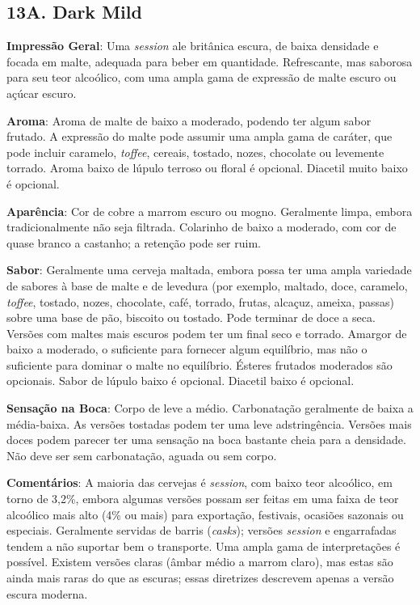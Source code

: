 \subsection*{13A. Dark Mild}
\textbf{Impressão Geral}: Uma \textit{session} ale britânica escura, de baixa densidade e focada em malte, adequada para beber em quantidade. Refrescante, mas saborosa para seu teor alcoólico, com uma ampla gama de expressão de malte escuro ou açúcar escuro.

\textbf{Aroma}: Aroma de malte de baixo a moderado, podendo ter algum sabor frutado. A expressão do malte pode assumir uma ampla gama de caráter, que pode incluir caramelo, \textit{toffee}, cereais, tostado, nozes, chocolate ou levemente torrado. Aroma baixo de lúpulo terroso ou floral é opcional. Diacetil muito baixo é opcional.

\textbf{Aparência}: Cor de cobre a marrom escuro ou mogno. Geralmente limpa, embora tradicionalmente não seja filtrada. Colarinho de baixo a moderado, com cor de quase branco a castanho; a retenção pode ser ruim.

\textbf{Sabor}: Geralmente uma cerveja maltada, embora possa ter uma ampla variedade de sabores à base de malte e de levedura (por exemplo, maltado, doce, caramelo, \textit{toffee}, tostado, nozes, chocolate, café, torrado, frutas, alcaçuz, ameixa, passas) sobre uma base de pão, biscoito ou tostado. Pode terminar de doce a seca. Versões com maltes mais escuros podem ter um final seco e torrado. Amargor de baixo a moderado, o suficiente para fornecer algum equilíbrio, mas não o suficiente para dominar o malte no equilíbrio. Ésteres frutados moderados são opcionais. Sabor de lúpulo baixo é opcional. Diacetil baixo é opcional.

\textbf{Sensação na Boca}: Corpo de leve a médio. Carbonatação geralmente de baixa a média-baixa. As versões tostadas podem ter uma leve adstringência. Versões mais doces podem parecer ter uma sensação na boca bastante cheia para a densidade. Não deve ser sem carbonatação, aguada ou sem corpo.

\textbf{Comentários}: A maioria das cervejas é \textit{session}, com baixo teor alcoólico, em torno de 3,2\%, embora algumas versões possam ser feitas em uma faixa de teor alcoólico mais alto (4\% ou mais) para exportação, festivais, ocasiões sazonais ou especiais. Geralmente servidas de barris (\textit{casks}); versões \textit{session} e engarrafadas tendem a não suportar bem o transporte. Uma ampla gama de interpretações é possível. Existem versões claras (âmbar médio a marrom claro), mas estas são ainda mais raras do que as escuras; essas diretrizes descrevem apenas a versão escura moderna.

